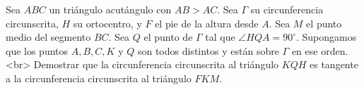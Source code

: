 Sea $ABC$ un triángulo acutángulo con $AB\gt AC$. Sea $\Gamma$ su circunferencia circunscrita, $H$ su ortocentro, y $F$ el pie de la altura desde $A$. Sea $M$ el punto medio del segmento $BC$. Sea $Q$ el punto de $\Gamma$ tal que $\angle HQA = 90^{\circ}$. Supongamos que los puntos $A,B,C,K$ y $Q$ son todos distintos y están sobre $\Gamma$ en ese orden.<br>
Demostrar que la circunferencia circunscrita al triángulo $KQH$ es tangente a la circunferencia circunscrita al triángulo $FKM$.
